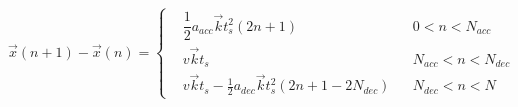 \documentclass{tufte-handout}
\begin{document}
\[
    \vec x(n+1)- \vec x(n) = \left\{\begin{aligned}
         & \dfrac{1}{2} a_{acc} \vec k t_s^2(2n+1)                      &  & 0<n<N_{acc}       \\
         & v\vec kt_s                                                   &  & N_{acc}<n<N_{dec} \\
         & v \vec k t_s-\frac{1}{2} a_{dec} \vec k t_s^2(2n+1-2N_{dec}) &  & N_{dec}<n<N
    \end{aligned}\right.
\]
\end{document}
